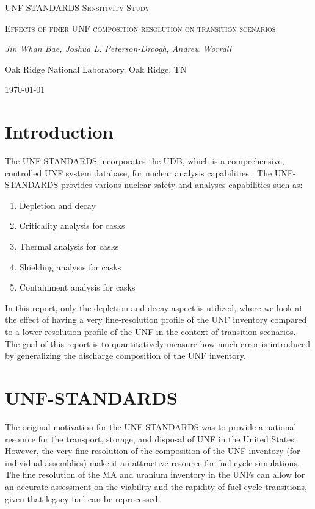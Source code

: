 \documentclass{article}
\begin{document}
\begin{titlepage}
    \centering
    {\scshape\LARGE \gls{UNF-STANDARDS} Sensitivity Study\par}
    \vspace{1cm}
    {\scshape\Large Effects of finer UNF composition resolution on transition scenarios \par}
    \vspace{2cm}
    {\Large\itshape Jin Whan Bae,
    Joshua L. Peterson-Droogh, Andrew Worrall \par}
    \vfill
    Oak Ridge National Laboratory, Oak Ridge, TN
    \vfill
    \vfill

    {\large \today\par}
\end{titlepage}




\section{Introduction}
The \gls{UNF-STANDARDS} incorporates the \gls{UDB}, which is a comprehensive, controlled \gls{UNF}
system database, for nuclear analysis capabilities \cite{banerjee_unf-ST&DARDS:_2016}. The
\gls{UNF-STANDARDS} provides various nuclear safety and analyses capabilities such as:
\begin{enumerate}
    \item Depletion and decay
    \item Criticality analysis for casks
    \item Thermal analysis for casks
    \item Shielding analysis for casks
    \item Containment analysis for casks
\end{enumerate}

In this report, only the depletion and decay aspect is utilized, where we look at the effect
of having a very fine-resolution profile of the \gls{UNF} inventory compared to a lower
resolution profile of the \gls{UNF} in the context of transition scenarios.
The goal of this report is to quantitatively measure
how much error is introduced by generalizing the discharge composition of the \gls{UNF}
inventory.


\section{\gls{UNF-STANDARDS}}
The original motivation for the \gls{UNF-STANDARDS} was to provide a national resource
for the transport, storage, and disposal of \gls{UNF} in the United States. However,
the very fine resolution of the composition of the \gls{UNF} inventory (for individual
assemblies) make it an attractive resource for fuel cycle simulations. The fine
resolution of the \gls{MA} and uranium inventory in the \glspl{UNF} can allow for an
accurate assessment on the viability and the rapidity of fuel cycle transitions,
given that legacy fuel can be reprocessed.
\end{document}
